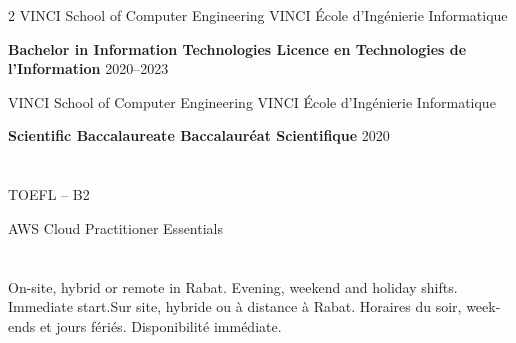 \documentclass[10pt,a4paper]{article}
\begin{document}
\begin{paracol}{2}
{
VINCI School of Computer Engineering
}
{VINCI École d'Ingénierie Informatique
}

\vspace{0.8em}

\textbf{
{Bachelor in Information Technologies}
{Licence en Technologies de l'Information}
}\hfill 2020--2023

{
VINCI School of Computer Engineering
}
{VINCI École d'Ingénierie Informatique
}

\vspace{0.8em}

\textbf{
{Scientific Baccalaureate}
{Baccalauréat Scientifique}
}\hfill 2020


\section*{}

TOEFL  -- B2

AWS Cloud Practitioner Essentials \textit{}


\section*{}

{On-site, hybrid or remote in Rabat. Evening, weekend and holiday shifts. Immediate start.}{Sur site, hybride ou à distance à Rabat. Horaires du soir, week-ends et jours fériés. Disponibilité immédiate.}

\switchcolumn


\section*{}


\end{paracol}
\end{document}
